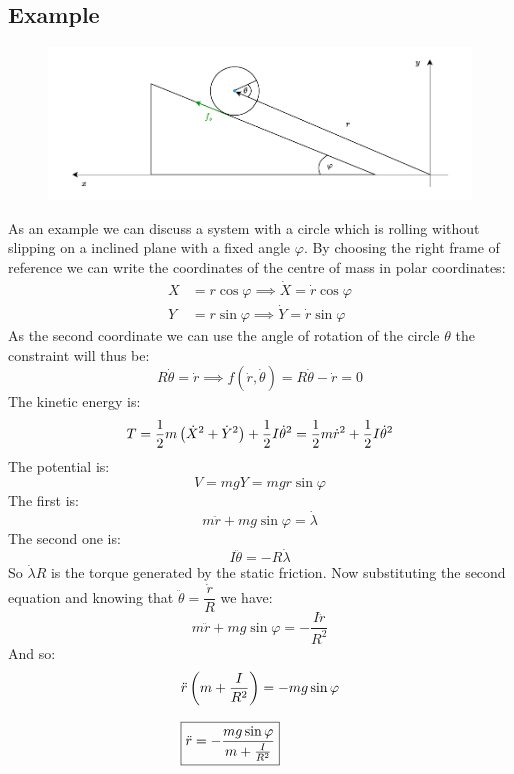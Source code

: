 \subsection{Example}
\begin{figure}[H]
    \centering
    \includegraphics[width=1\linewidth]{res/svg/rolling_without_slipping.drawio}
\end{figure}
As an example we can discuss a system with a circle which is rolling without slipping on a inclined plane with a fixed angle $\varphi$. By choosing the right frame of reference we can write the coordinates of the centre of mass in polar coordinates:
\begin{equation}
  \begin{split}
    X &= r\cos\varphi \implies \dot{X} = \dot{r}\cos\varphi\\[8pt]
    Y &= r\sin\varphi \implies \dot{Y} = \dot{r}\sin\varphi
  \end{split}
\end{equation}
As the second coordinate we can use the angle of rotation of the circle $\theta$ the constraint will thus be:
\begin{equation}
  R\dot{\theta} = \dot{r} \implies f(\dot{r},\dot{\theta}) = R\dot{\theta} - \dot{r} = 0
\end{equation}
The kinetic energy is:
\begin{equation}
  T = \dfrac{1}{2}m\left(\dot{X}^2+\dot{Y}^2\right) + \dfrac{1}{2}I\dot{\theta}^2 = \dfrac{1}{2}m\dot{r}^2 + \dfrac{1}{2}I\dot{\theta}^2
\end{equation}
The potential is:
\begin{equation}
  V = mgY = mgr\sin\varphi
\end{equation}
The first \eleref\;is:
\begin{equation}
  m\ddot{r} + mg\sin\varphi = \dot{\lambda}
\end{equation}
The second one is:
\begin{equation}
  I\ddot{\theta} = -R\dot{\lambda}
\end{equation}
So $\dot{\lambda}R$ is the torque generated by the static friction. Now substituting the second equation and knowing that $\ddot{\theta} = \dfrac{\dot{r}}{R}$ we have:
\begin{equation}
  m\ddot{r} + mg\sin\varphi = -\dfrac{I\ddot{r}}{R^2}
\end{equation}
And so:
\begin{equation}
  \begin{split}
    &\ddot{r}\left(m+\dfrac{I}{R^2}\right) = -mg\sin\varphi \\[8pt]
    &\boxed{\ddot{r} = -\dfrac{mg\sin\varphi}{m+\frac{I}{R^2}}}
  \end{split}
\end{equation}

